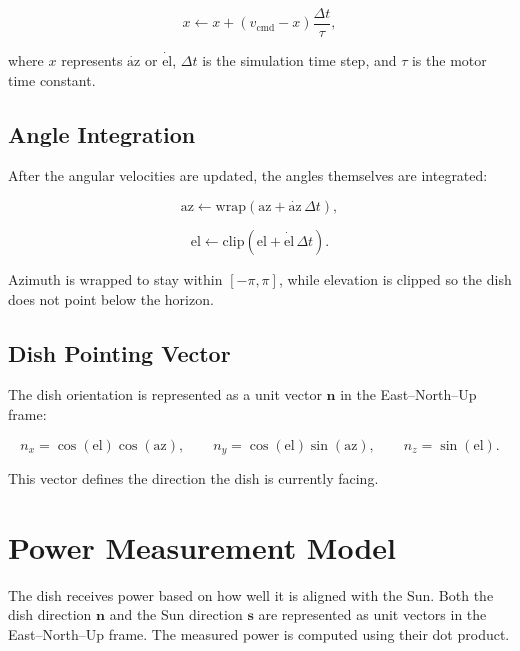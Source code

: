 \documentclass[11pt,a4paper]{article}
\begin{document}
\begin{equation}
\label{eq:lag}
x \leftarrow x + \left( v_{\text{cmd}} - x \right) \frac{\Delta t}{\tau},
\end{equation}

where $x$ represents $\dot{\mathrm{az}}$ or $\dot{\mathrm{el}}$,  
$\Delta t$ is the simulation time step,  
and $\tau$ is the motor time constant.

\subsection{Angle Integration}

After the angular velocities are updated, the angles themselves are integrated:

\begin{equation}
\label{eq:az_update}
\mathrm{az} \leftarrow \mathrm{wrap}\left( \mathrm{az} + \dot{\mathrm{az}} \, \Delta t \right),
\end{equation}

\begin{equation}
\label{eq:el_update}
\mathrm{el} \leftarrow \mathrm{clip}\left( \mathrm{el} + \dot{\mathrm{el}} \, \Delta t \right).
\end{equation}

Azimuth is wrapped to stay within $[-\pi, \pi]$,  
while elevation is clipped so the dish does not point below the horizon.

\subsection{Dish Pointing Vector}

The dish orientation is represented as a unit vector $\mathbf{n}$ in the East--North--Up frame:

\begin{equation}
\label{eq:n_vector}
n_x = \cos(\mathrm{el}) \cos(\mathrm{az}), \qquad
n_y = \cos(\mathrm{el}) \sin(\mathrm{az}), \qquad
n_z = \sin(\mathrm{el}).
\end{equation}

This vector defines the direction the dish is currently facing.

\section{Power Measurement Model}

The dish receives power based on how well it is aligned with the Sun.  
Both the dish direction $\mathbf{n}$ and the Sun direction $\mathbf{s}$ are represented as unit vectors in the East--North--Up frame.  
The measured power is computed using their dot product.
\end{document}
